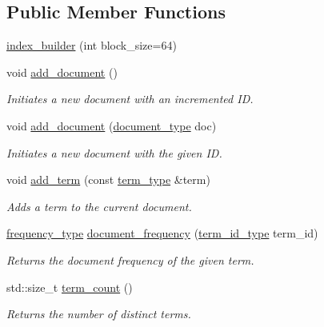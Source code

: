 \subsection*{Public Member Functions}
\begin{DoxyCompactItemize}
\item 
\mbox{\hyperlink{classirk_1_1index__builder_a828accec899ce3440bc52268ed3979fa}{index\+\_\+builder}} (int block\+\_\+size=64)
\item 
void \mbox{\hyperlink{classirk_1_1index__builder_a005813bfb531005ce2ca54a9f7cfd261}{add\+\_\+document}} ()
\begin{DoxyCompactList}\small\item\em Initiates a new document with an incremented ID. \end{DoxyCompactList}\item 
void \mbox{\hyperlink{classirk_1_1index__builder_ac7c266fbf628b828059ac89b6f6ad1cc}{add\+\_\+document}} (\mbox{\hyperlink{classirk_1_1index__builder_a4230ae91e9f84c95ee99b3607c6e952e}{document\+\_\+type}} doc)
\begin{DoxyCompactList}\small\item\em Initiates a new document with the given ID. \end{DoxyCompactList}\item 
void \mbox{\hyperlink{classirk_1_1index__builder_a73e03d40562487c47ed14f6d2412c7ca}{add\+\_\+term}} (const \mbox{\hyperlink{classirk_1_1index__builder_ad80a8f10f3e72ed3b9a2f181350f3f1f}{term\+\_\+type}} \&term)
\begin{DoxyCompactList}\small\item\em Adds a term to the current document. \end{DoxyCompactList}\item 
\mbox{\hyperlink{classirk_1_1index__builder_af2efa68fc3f10fd9cb000d16279bfbb1}{frequency\+\_\+type}} \mbox{\hyperlink{classirk_1_1index__builder_ab760ed3512980d0d76395b21b354f45a}{document\+\_\+frequency}} (\mbox{\hyperlink{classirk_1_1index__builder_a6736f4a9aa142d3ca15c5e8c3b0a352f}{term\+\_\+id\+\_\+type}} term\+\_\+id)
\begin{DoxyCompactList}\small\item\em Returns the document frequency of the given term. \end{DoxyCompactList}\item 
std\+::size\+\_\+t \mbox{\hyperlink{classirk_1_1index__builder_a0ef10a3de8336e82fe5b03fc1b1ddd45}{term\+\_\+count}} ()
\begin{DoxyCompactList}\small\item\em Returns the number of distinct terms. \end{DoxyCompactList}\item 

\end{DoxyCompactItemize}
